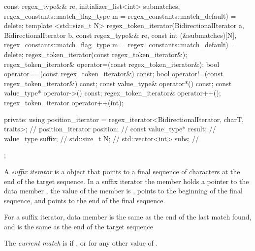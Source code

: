 \begin{codeblock}
{{                         const regex_type&& re,
                         initializer_list<int> submatches,
                         regex_constants::match_flag_type m =
                           regex_constants::match_default) = delete;
    template <std::size_t N>
    regex_token_iterator(BidirectionalIterator a, BidirectionalIterator b,
                         const regex_type&& re,
                         const int (&submatches)[N],
                         regex_constants::match_flag_type m =
                           regex_constants::match_default) = delete;                          
    regex_token_iterator(const regex_token_iterator&);
    regex_token_iterator& operator=(const regex_token_iterator&);
    bool operator==(const regex_token_iterator&) const;
    bool operator!=(const regex_token_iterator&) const;
    const value_type& operator*() const;
    const value_type* operator->() const;
    regex_token_iterator& operator++();
    regex_token_iterator operator++(int);

  private:
    using position_iterator =
          regex_iterator<BidirectionalIterator, charT, traits>; // \expos
    position_iterator position;                                 // \expos
    const value_type* result;                                   // \expos
    value_type suffix;                                          // \expos
    std::size_t N;                                              // \expos
    std::vector<int> subs;                                      // \expos
  };
}
\end{codeblock}

\pnum
A \textit{suffix iterator} is a  object
that points to a final sequence of characters at
the end of the target sequence. In a suffix iterator the
member  holds a pointer to the data
member , the value of the member 
is ,  points to the beginning of the
final sequence, and  points to the end of the
final sequence. 

\pnum
\begin{note} For a suffix iterator, data
member  is the same as the end of the last match
found, and  is the same as the end of the target
sequence \end{note}

\pnum
The \textit{current match} is  if , or
 for any other value of .

